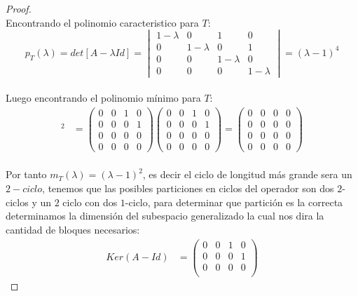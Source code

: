 \documentclass[11pt]{article}
\begin{document}
\begin{proof}
\begin{equation*}
    \end{equation*}
    Encontrando el polinomio caracteristico para $T$:
    \begin{equation*}
       p_{T}(\lambda)= det[A-\lambda Id]=\begin{vmatrix}
        1-\lambda&0&1&0\\
        0&1-\lambda&0&1\\
        0&0&1-\lambda&0\\
        0&0&0&1-\lambda
        \end{vmatrix}=(\lambda-1)^4
    \end{equation*}\,\\
    Luego encontrando el polinomio m\'inimo para $T$:\,\\
    \begin{align*}
        [A-Id]^2&=\begin{pmatrix}
        0&0&1&0\\
        0&0&0&1\\
        0&0&0&0\\
        0&0&0&0
        \end{pmatrix}
        \begin{pmatrix}
        0&0&1&0\\
        0&0&0&1\\
        0&0&0&0\\
        0&0&0&0
        \end{pmatrix}=\begin{pmatrix}
        0&0&0&0\\
        0&0&0&0\\
        0&0&0&0\\
        0&0&0&0
        \end{pmatrix}
    \end{align*}\,\\
    Por tanto $m_T(\lambda)=(\lambda-1)^2$, es decir el ciclo de longitud m\'as grande sera un $2-ciclo$, tenemos que las posibles particiones en ciclos del operador son dos $2$-ciclos y un $2$ ciclo con dos $1$-ciclo, para determinar
    que partici\'on es la correcta determinamos la dimensi\'on del subespacio generalizado la cual nos dira la cantidad de bloques necesarios:\,\\
    \begin{align*}
        Ker(A-Id)&=\begin{pmatrix}
            0&0&1&0\\
            0&0&0&1\\
            0&0&0&0\\

\end{pmatrix}
\end{align*}
\end{proof}
\end{document}
